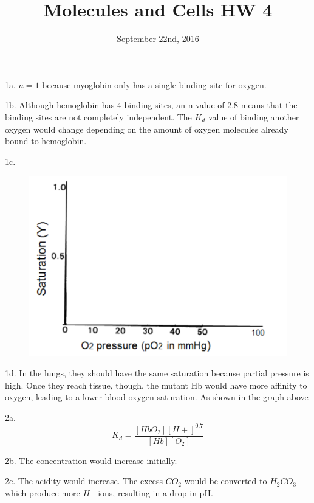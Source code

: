 \documentclass{article}
\title{Molecules and Cells HW 4}
\date{September 22nd, 2016}
\begin{document}
\maketitle

1a.	$n=1$ because myoglobin only has a single binding site for oxygen.

1b. Although hemoglobin has 4 binding sites, an n value of 2.8 means that the binding sites are not completely independent. The $K_d$ value of binding another oxygen would change depending on the amount of oxygen molecules already bound to hemoglobin.

1c. \begin{figure}[h]
  \centering
  \includegraphics[scale=0.25]{PartialPressureBlank.png}
\end{figure}

1d. In the lungs, they should have the same saturation because partial pressure is high. Once they reach tissue, though, the mutant Hb would have more affinity to oxygen, leading to a lower blood oxygen saturation. As shown in the graph above

2a. $$K_d=\frac{[HbO_2][H+]^{0.7}}{[Hb][O_2]}$$

2b. The concentration would increase initially.

2c. The acidity would increase. The excess $CO_2$ would be converted to $H_2CO_3$ which produce more $H^+$ ions, resulting in a drop in pH.
\end{document}
